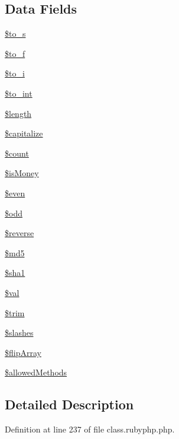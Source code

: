 \subsection*{Data Fields}
\begin{DoxyCompactItemize}
\item 
\hyperlink{classr_a5469620d055732b419fff71704232d2f}{\$to\-\_\-s}
\item 
\hyperlink{classr_a85a2ada0b16d9e59f094e77df5848459}{\$to\-\_\-f}
\item 
\hyperlink{classr_afecc47a810cf510aff6387286b9c0e73}{\$to\-\_\-i}
\item 
\hyperlink{classr_a41eb7bfd09e3b6ad118551accfaad638}{\$to\-\_\-int}
\item 
\hyperlink{classr_adf14d8e29912c1855022dfa252aa4087}{\$length}
\item 
\hyperlink{classr_a41c83fecb936997f3e2dae40207e31dd}{\$capitalize}
\item 
\hyperlink{classr_af789423037bbc89dc7c850e761177570}{\$count}
\item 
\hyperlink{classr_aa2f5c87cc7b1ab41965e940d5c1406d9}{\$is\-Money}
\item 
\hyperlink{classr_ab661cd196618c18d23108b83a10728f3}{\$even}
\item 
\hyperlink{classr_aee2d4fa4e98da4e6ad23bee644ab5e7a}{\$odd}
\item 
\hyperlink{classr_ae0d210fd358fa750a11e63b26f6d26ea}{\$reverse}
\item 
\hyperlink{classr_a2557b214f57a046187b88572e443da1f}{\$md5}
\item 
\hyperlink{classr_a310d84f0b735d2ab692b4e2acd90e7ef}{\$sha1}
\item 
\hyperlink{classr_aac81a74a7b30767af29bfd9a695636df}{\$val}
\item 
\hyperlink{classr_a0ca8b395aaa07c4aac3bdb1f9964d4f5}{\$trim}
\item 
\hyperlink{classr_ac95fd27a35f2d9674ef3760a4ea1d07f}{\$slashes}
\item 
\hyperlink{classr_a530c822a487ad325618509d8bf48553a}{\$flip\-Array}
\item 
\hyperlink{classr_ab278eba7cab5341dacdccecd7a2cc2df}{\$allowed\-Methods}
\end{DoxyCompactItemize}


\subsection{Detailed Description}


Definition at line 237 of file class.\-rubyphp.\-php.



